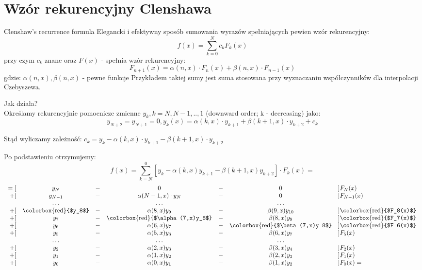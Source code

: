 \section{Wzór rekurencyjny Clenshawa}
\begin{frame}{Clenshaw's recurrence formula}
	Elegancki i efektywny sposób sumowania wyrazów spełniających pewien wzór rekurencyjny:
    $$f(x) = \sum_{k=0}^{N}c_kF_k(x)$$
    przy czym $c_k$ znane oraz $F(x)$ - spełnia wzór rekurencyjny:
    $$F_{n+1}(x) = \alpha(n,x) \cdot F_n(x) + \beta(n,x) \cdot F_{n-1}(x)$$
   gdzie: $\alpha(n,x),\beta(n,x)$ - pewne funkcje\newline
   Przykładem takiej sumy jest suma stosowana przy wyznaczaniu współczynników dla interpolacji Czebyszewa.
\end{frame}
\begin{frame}
Jak działa?\\

    Określamy rekurencyjnie  pomocnicze zmienne $y_k,k = N,N-1,..,1$ (downward order; k - decreasing) jako:
    $$y_{N+2}=y_{N+1} = 0, y_k(x) = \alpha(k,x) \cdot y_{k+1}+\beta(k+1,x) \cdot y_{k+2}+c_k$$
    
    Stąd wyliczamy zależność: $c_k = y_k - \alpha(k,x) \cdot y_{k+1} - \beta(k+1,x) \cdot y_{k+2}$ \newline
\end{frame} 
\begin{frame}
	Po podstawieniu otrzymujemy:
    $$f(x) = \sum_{k=N}^{0}[y_k-\alpha(k,x)y_{k+1}-\beta(k+1,x)y_{k+2}] \cdot F_k(x) = $$
    $$\left.\begin{array}{rcccccl}
    	=[ & y_N & - & 0 & - & 0 & ] F_N(x) \\
        +[ &y_{N-1}& - & \alpha(N-1,x)\cdot y_N & - & 0 & ] F_{N-1}(x) \\
         & \ldots & & \ldots & & \ldots & \\
         +[ & \textrm{\colorbox{red}{$y_8$}} & - & \alpha(8,x)y_9 & - & \beta(9,x)y_{10} & ] \textrm{\colorbox{red}{$F_8(x)$}} \\
		+[ & y_7 & - & \textrm{\colorbox{red}{$\alpha(7,x)y_8$}} & - & \beta(8,x)y_9 & ] \textrm{\colorbox{red}{$F_7(x)$}} \\
        +[ & y_6 & - & \alpha(6,x)y_7 & - & \textrm{\colorbox{red}{$\beta(7,x)y_8$}} & ] \textrm{\colorbox{red}{$F_6(x)$}} \\
        +[ & y_5 & - & \alpha(5,x)y_6 & - & \beta(6,x)y_7 & ] F_5(x) \\
         & \ldots & & \ldots & & \ldots & \\
		+[ & y_2 & - & \alpha(2,x)y_3 & - & \beta(3,x)y_4 & ] F_2(x) \\
        +[ & y_1 & - & \alpha(1,x)y_2 & - & \beta(2,x)y_3 & ] F_1(x) \\
        +[ & y_0 & - & \alpha(0,x)y_1 & - & \beta(1,x)y_2 & ] F_0(x) =
    \end{array}\right.$$
\end{frame}
